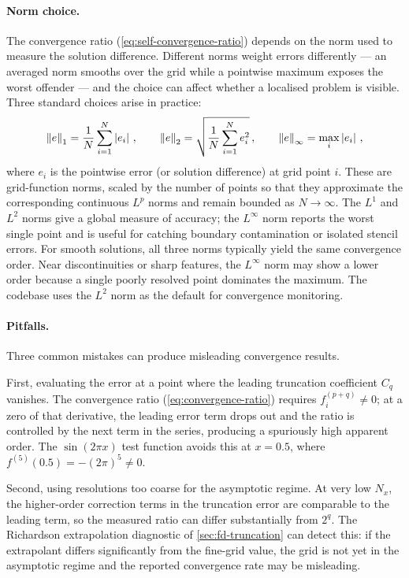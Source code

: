 \paragraph{Norm choice.}

The convergence ratio (\cref{eq:self-convergence-ratio}) depends on the
norm used to measure the solution difference.  Different norms weight
errors differently --- an averaged norm smooths over the grid while a
pointwise maximum exposes the worst offender --- and the choice can
affect whether a localised problem is visible.  Three standard choices
arise in practice:
%
\begin{equation}
  \left\lVert e \right\rVert_1 = \frac{1}{N}\sum_{i=1}^{N} \left\lvert e_i \right\rvert \,, \qquad
  \left\lVert e \right\rVert_2 = \sqrt{\frac{1}{N}\sum_{i=1}^{N} e_i^2} \,, \qquad
  \left\lVert e \right\rVert_\infty = \max_i \left\lvert e_i \right\rvert \,,
  \label{eq:norms}
\end{equation}
%
where $e_i$ is the pointwise error (or solution difference) at grid point
$i$.  These are grid-function norms, scaled by the number of points so
that they approximate the corresponding continuous $L^p$ norms and remain
bounded as $N \to \infty$.  The $L^1$ and $L^2$ norms give a global
measure of accuracy; the $L^\infty$ norm reports the worst single point
and is useful for catching boundary contamination or isolated stencil
errors.  For smooth solutions, all three norms typically yield the same
convergence order.  Near discontinuities or sharp features, the
$L^\infty$ norm may show a lower order because a single poorly resolved
point dominates the maximum.  The codebase uses the $L^2$ norm as the
default for convergence monitoring.

\paragraph{Pitfalls.}

Three common mistakes can produce misleading convergence results.

First, evaluating the error at a point where the leading truncation
coefficient $C_q$ vanishes.  The convergence ratio
(\cref{eq:convergence-ratio}) requires $f^{(p+q)}_i \neq 0$; at a zero
of that derivative, the leading error term drops out and the ratio is
controlled by the next term in the series, producing a spuriously high
apparent order.  The $\sin(2\pi x)$ test function avoids this at
$x = 0.5$, where $f^{(5)}(0.5) = -(2\pi)^5 \neq 0$.

Second, using resolutions too coarse for the asymptotic regime.
At very low $N_x$, the higher-order correction terms in the truncation
error are comparable to the leading term, so the measured ratio can
differ substantially from $2^q$.  The Richardson extrapolation diagnostic
of \cref{sec:fd-truncation} can detect this: if the extrapolant differs
significantly from the fine-grid value, the grid is not yet in the
asymptotic regime and the reported convergence rate may be misleading.

